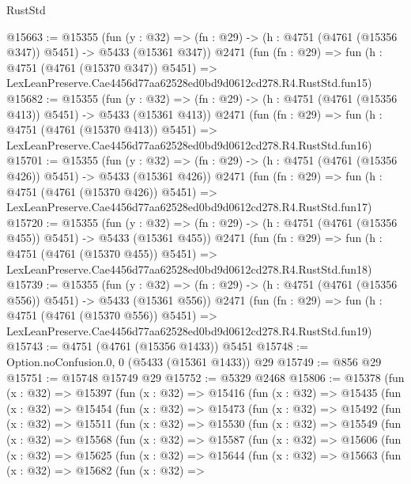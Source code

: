 \begin{lexlean}{RustStd}
\begin{coremodule}
@15663 := @15355
    (fun (y : @32) => (fn : @29) -> (h : @4751 (@4761 (@15356 @347)) @5451) -> @5433 (@15361 @347))
    @2471
    (fun (fn : @29) =>
    fun (h : @4751 (@4761 (@15370 @347)) @5451) =>
    LexLeanPreserve.Cae4456d77aa62528ed0bd9d0612cd278.R4.RustStd.fun15)
@15682 := @15355
    (fun (y : @32) => (fn : @29) -> (h : @4751 (@4761 (@15356 @413)) @5451) -> @5433 (@15361 @413))
    @2471
    (fun (fn : @29) =>
    fun (h : @4751 (@4761 (@15370 @413)) @5451) =>
    LexLeanPreserve.Cae4456d77aa62528ed0bd9d0612cd278.R4.RustStd.fun16)
@15701 := @15355
    (fun (y : @32) => (fn : @29) -> (h : @4751 (@4761 (@15356 @426)) @5451) -> @5433 (@15361 @426))
    @2471
    (fun (fn : @29) =>
    fun (h : @4751 (@4761 (@15370 @426)) @5451) =>
    LexLeanPreserve.Cae4456d77aa62528ed0bd9d0612cd278.R4.RustStd.fun17)
@15720 := @15355
    (fun (y : @32) => (fn : @29) -> (h : @4751 (@4761 (@15356 @455)) @5451) -> @5433 (@15361 @455))
    @2471
    (fun (fn : @29) =>
    fun (h : @4751 (@4761 (@15370 @455)) @5451) =>
    LexLeanPreserve.Cae4456d77aa62528ed0bd9d0612cd278.R4.RustStd.fun18)
@15739 := @15355
    (fun (y : @32) => (fn : @29) -> (h : @4751 (@4761 (@15356 @556)) @5451) -> @5433 (@15361 @556))
    @2471
    (fun (fn : @29) =>
    fun (h : @4751 (@4761 (@15370 @556)) @5451) =>
    LexLeanPreserve.Cae4456d77aa62528ed0bd9d0612cd278.R4.RustStd.fun19)
@15743 := @4751 (@4761 (@15356 @1433)) @5451
@15748 := Option.noConfusion.{0, 0} (@5433 (@15361 @1433)) @29
@15749 := @856 @29
@15751 := @15748 @15749 @29
@15752 := @5329 @2468
@15806 := @15378
    (fun (x : @32) =>
    @15397
      (fun (x : @32) =>
      @15416
        (fun (x : @32) =>
        @15435
          (fun (x : @32) =>
          @15454
            (fun (x : @32) =>
            @15473
              (fun (x : @32) =>
              @15492
                (fun (x : @32) =>
                @15511
                  (fun (x : @32) =>
                  @15530
                    (fun (x : @32) =>
                    @15549
                      (fun (x : @32) =>
                      @15568
                        (fun (x : @32) =>
                        @15587
                          (fun (x : @32) =>
                          @15606
                            (fun (x : @32) =>
                            @15625
                              (fun (x : @32) =>
                              @15644
                                (fun (x : @32) =>
                                @15663
                                  (fun (x : @32) =>
                                  @15682
                                    (fun (x : @32) =>

\end{coremodule}
\end{lexlean}
